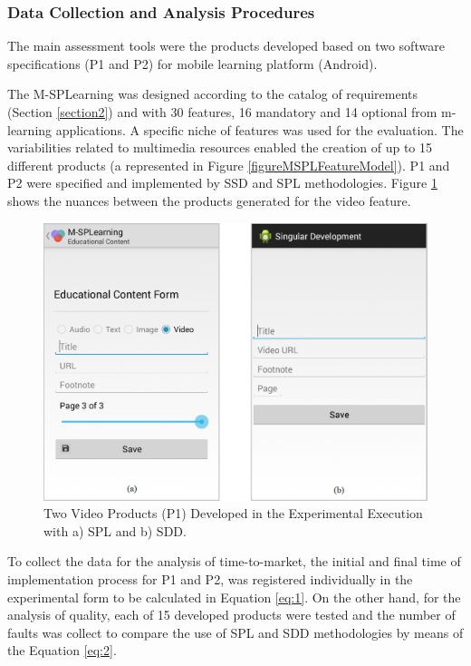 \subsubsection{Data Collection and Analysis Procedures}

The main assessment tools were the products developed based on two software specifications (P1 and P2) for mobile learning platform (Android).

The M-SPLearning was designed according to the catalog of requirements (Section \ref{section2}) and with 30 features, 16 mandatory and 14 optional from m-learning applications. A specific niche of features was used for the evaluation. The variabilities related to multimedia resources enabled the creation of up to 15 different products (a represented in Figure \ref{figureMSPLFeatureModel}). P1 and P2 were specified and implemented by SSD and SPL methodologies. Figure \ref{fig:prod} shows the nuances between the products generated for the video feature.


\begin{figure}
\centering
\includegraphics[scale=0.272]{figures/section4/prod.png}
\centering
\caption{Two Video Products (P1) Developed in the Experimental Execution with a) SPL and b) SDD.}
\label{fig:prod}
\end{figure}


To collect the data for the analysis of time-to-market, the initial and final time of implementation process for P1 and P2, was registered individually in the experimental form to be calculated in Equation \ref{eq:1}. On the other hand, for the analysis of quality, each of 15 developed products were tested and the number of faults was collect to compare the use of SPL and SDD methodologies by means of the Equation \ref{eq:2}.

